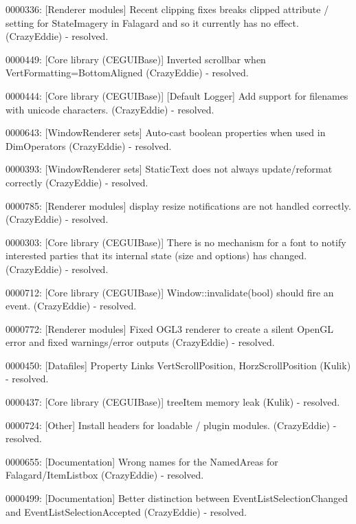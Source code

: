 \begin{DoxyItemize}
\item 0000336\+: \mbox{[}Renderer modules\mbox{]} Recent clipping fixes breaks \textquotesingle{}clipped\textquotesingle{} attribute / setting for State\+Imagery in Falagard and so it currently has no effect. (Crazy\+Eddie) -\/ resolved.
\item 0000449\+: \mbox{[}Core library (C\+E\+G\+U\+I\+Base)\mbox{]} Inverted scrollbar when Vert\+Formatting=Bottom\+Aligned (Crazy\+Eddie) -\/ resolved.
\item 0000444\+: \mbox{[}Core library (C\+E\+G\+U\+I\+Base)\mbox{]} \mbox{[}Default Logger\mbox{]} Add support for filenames with unicode characters. (Crazy\+Eddie) -\/ resolved.
\item 0000643\+: \mbox{[}Window\+Renderer sets\mbox{]} Auto-\/cast boolean properties when used in Dim\+Operators (Crazy\+Eddie) -\/ resolved.
\item 0000393\+: \mbox{[}Window\+Renderer sets\mbox{]} Static\+Text does not always update/reformat correctly (Crazy\+Eddie) -\/ resolved.
\item 0000785\+: \mbox{[}Renderer modules\mbox{]} display resize notifications are not handled correctly. (Crazy\+Eddie) -\/ resolved.
\item 0000303\+: \mbox{[}Core library (C\+E\+G\+U\+I\+Base)\mbox{]} There is no mechanism for a font to notify interested parties that its internal state (size and options) has changed. (Crazy\+Eddie) -\/ resolved.
\item 0000712\+: \mbox{[}Core library (C\+E\+G\+U\+I\+Base)\mbox{]} Window\+::invalidate(bool) should fire an event. (Crazy\+Eddie) -\/ resolved.
\item 0000772\+: \mbox{[}Renderer modules\mbox{]} Fixed O\+G\+L3 renderer to create a silent Open\+GL error and fixed warnings/error outputs (Crazy\+Eddie) -\/ resolved.
\item 0000450\+: \mbox{[}Datafiles\mbox{]} Property Links Vert\+Scroll\+Position, Horz\+Scroll\+Position (Kulik) -\/ resolved.
\item 0000437\+: \mbox{[}Core library (C\+E\+G\+U\+I\+Base)\mbox{]} tree\+Item memory leak (Kulik) -\/ resolved.
\item 0000724\+: \mbox{[}Other\mbox{]} Install headers for loadable / plugin modules. (Crazy\+Eddie) -\/ resolved.
\item 0000655\+: \mbox{[}Documentation\mbox{]} Wrong names for the Named\+Areas for Falagard/\+Item\+Listbox (Crazy\+Eddie) -\/ resolved.
\item 0000499\+: \mbox{[}Documentation\mbox{]} Better distinction between Event\+List\+Selection\+Changed and Event\+List\+Selection\+Accepted (Crazy\+Eddie) -\/ resolved.

\end{DoxyItemize}
